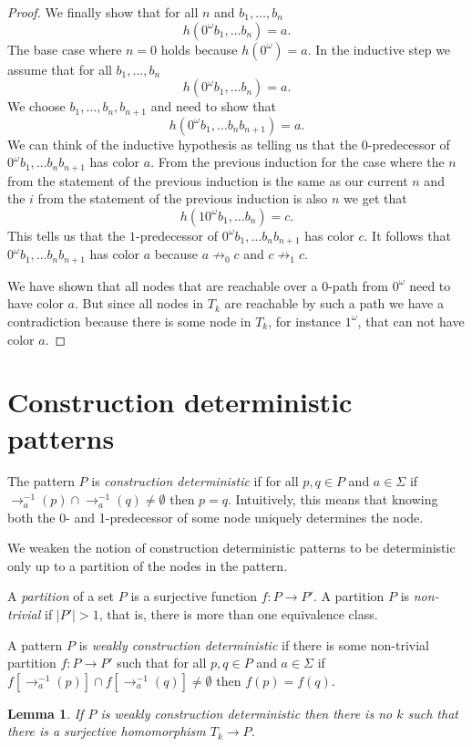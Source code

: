 \documentclass[a4paper]{article}
\newcommand{\prearrow}[1]{{\rightarrow_{#1}^{-1}}}
\newtheorem{lemma}[theorem]{Lemma}
\begin{document}
\begin{proof}
\medskip

We finally show that for all $n$ and $b_1,\dots,b_n$
\[
 h(0^\omega b_1,\dots b_n) = a.
\]
The base case where $n = 0$ holds because $h(0^\omega) = a$.
In the inductive step we assume that for all $b_1,\dots,b_n$
\[
 h(0^\omega b_1,\dots b_n) = a.
\]
We choose $b_1,\dots,b_n,b_{n + 1}$ and need to show that
\[
 h(0^\omega b_1,\dots b_n b_{n + 1}) = a.
\]
We can think of the inductive hypothesis as telling us that the
$0$-predecessor of $0^\omega b_1,\dots b_n b_{n + 1}$ has color $a$.
From the previous induction for the case where the $n$ from the
statement of the previous induction is the same as our current $n$ and
the $i$ from the statement of the previous induction is also $n$ we get
that
\[
 h(1 0^\omega b_1,\dots b_n) = c.
\]
This tells us that the $1$-predecessor of $0^\omega b_1,\dots b_n b_{n +
1}$ has color $c$. It follows that $0^\omega b_1,\dots b_n b_{n +
1}$ has color $a$ because $a \not \rightarrow_0 c$ and $c \not
\rightarrow_1 c$.

\medskip

We have shown that all nodes that are reachable over a $0$-path from
$0^\omega$ need to have color $a$. But since all nodes in $T_k$ are
reachable by such a path we have a contradiction because there is some
node in $T_k$, for instance $1^\omega$, that can not have color $a$.
\end{proof}


\section{Construction deterministic patterns}

The pattern $P$ is \emph{construction deterministic} if for all $p,q \in
P$ and $a \in \Sigma$ if $\prearrow{a}(p) \cap \prearrow{a}(q) \neq
\emptyset$ then $p = q$. Intuitively, this means that knowing both the
0- and 1-predecessor of some node uniquely determines the node.

We weaken the notion of construction deterministic patterns to be
deterministic only up to a partition of the nodes in the pattern.

A \emph{partition} of a set $P$ is a surjective function $f : P \to P'$.
A partition $P$ is \emph{non-trivial} if $|P'| > 1$, that is, there is
more than one equivalence class.

A pattern $P$ is \emph{weakly construction deterministic} if there is
some non-trivial partition $f : P \to P'$ such that for all $p,q \in P$
and $a \in \Sigma$ if $f[\prearrow{a}(p)] \cap f[\prearrow{a}(q)] \neq
\emptyset$ then $f(p) = f(q)$.

\begin{lemma} \label{killer lemma}
 If $P$ is weakly construction deterministic then there is no $k$ such
that there is a surjective homomorphism $T_k \to P$.
\end{lemma}
\end{document}
